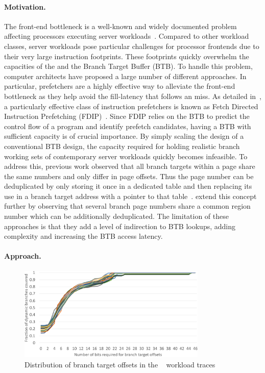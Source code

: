 \documentclass[../main.tex]{subfiles}
\begin{document}
\begin{refsection}
\paragraph{Motivation.}
The front-end bottleneck is a well-known and widely documented problem
affecting processors executing server
workloads~\cite{ailamaki99_dbmss_moder_proces,ferdman12_clear_cloud,kanev15_profil,ayers19_asmdb}. Compared
to other workload classes, server workloads pose particular challenges
for processor frontends due to their very large instruction
footprints. These footprints quickly overwhelm the capacities of the
 and the Branch Target Buffer (BTB). To handle
this problem, computer architects have proposed a large number of
different approaches. In particular,  prefetchers
are a highly effective way to alleviate the front-end bottleneck as
they help avoid the fill-latency that follows an 
miss.  As detailed in~, a particularly
effective class of instruction prefetchers is known as Fetch Directed
Instruction Prefetching
(FDIP)~\cite{reinman99_fetch_direc_instr_prefet}. Since FDIP relies on
the BTB to predict the control flow of a program and identify prefetch
candidates, having a BTB with sufficient capacity is of crucial
importance. By simply scaling the design of a conventional BTB design,
the capacity required for holding realistic branch working sets of
contemporary server workloads quickly becomes infeasible. To address
this, previous work observed that all branch targets within a page
share the same numbers and only differ in page offsets. Thus the page
number can be deduplicated by only storing it once in a dedicated
table and then replacing its use in a branch target address with a
pointer to that
table~\cite{seznec96_dont_use_page_number_point_it}. \textcite{soundararajan21_pdede}
extend this concept further by observing that several branch page
numbers share a common region number which can be additionally
deduplicated. The limitation of these approaches is that they add a
level of indirection to BTB lookups, adding complexity and increasing
the BTB access latency.


\paragraph{Approach.}

\begin{figure}[ht]
  \centering
  \includegraphics[width=0.8\textwidth]{figures/offset_distribution.pdf}
  \caption{\label{fig:offset-distr} Distribution of branch target offsets in the ~\cite{ipc1} workload traces}
\end{figure}


\end{refsection}
\end{document}
